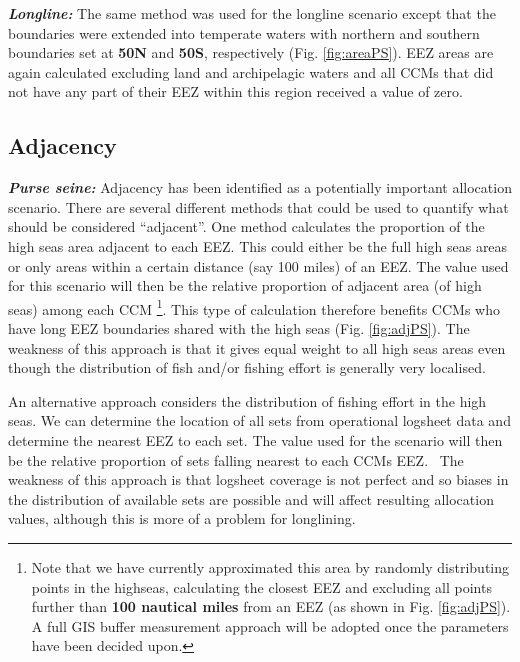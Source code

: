 \documentclass[11pt]{article}
\begin{document}
\noindent\textbf{\emph{Longline:}}
The same method was used for the longline scenario except that the boundaries were extended into temperate waters with northern and southern boundaries set at {\bf 50\degree N} and {\bf 50\degree S}, respectively (Fig. \ref{fig:areaPS}). EEZ areas are again calculated excluding land and archipelagic waters and all CCMs that did not have any part of their EEZ within this region received a value of zero.

\subsection*{Adjacency}
\noindent\textbf{\emph{Purse seine:}}
Adjacency has been identified as a potentially important allocation scenario. There are several different methods that could be used to quantify what should be considered ``adjacent''. One method calculates the proportion of the high seas area adjacent to each EEZ. This could either be the full high seas areas or only areas within a certain distance (say 100 miles) of an EEZ. The value used for this scenario will then be the relative proportion of adjacent area (of high seas) among each CCM \footnote{Note that we have currently approximated this area by randomly distributing points in the highseas, calculating the closest EEZ and excluding all points further than {\bf 100 nautical miles} from an EEZ (as shown in Fig. \ref{fig:adjPS}). A full GIS buffer measurement approach will be adopted once the parameters have been decided upon.}. This type of calculation therefore benefits CCMs who have long EEZ boundaries shared with the high seas (Fig. \ref{fig:adjPS}). The weakness of this approach is that it gives equal weight to all high seas areas even though the distribution of fish and/or fishing effort is generally very localised.

An alternative approach considers the distribution of fishing effort in the high seas. We can determine the location of all sets from operational logsheet data and determine the nearest EEZ to each set. The value used for the scenario will then be the relative proportion of sets falling nearest to each CCMs EEZ.%
\ The weakness of this approach is that logsheet coverage is not perfect and so biases in the distribution of available sets are possible and will affect resulting allocation values, although this is more of a problem for longlining.
\end{document}
